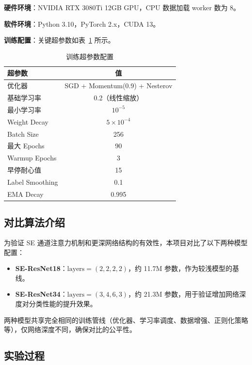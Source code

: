 \documentclass[12pt,a4paper]{ctexart}
\begin{document}
\textbf{硬件环境}：NVIDIA RTX 3080Ti 12GB GPU，CPU 数据加载 worker 数为 8。

\textbf{软件环境}：Python 3.10，PyTorch 2.x，CUDA 13。

\textbf{训练配置}：关键超参数如表~\ref{tab:hyperparams} 所示。

\begin{table}[H]
    \centering
    \caption{训练超参数配置}
    \label{tab:hyperparams}
    \begin{tabular}{lc}
        \toprule
        \textbf{超参数} & \textbf{值} \\
        \midrule
        优化器 & SGD + Momentum(0.9) + Nesterov \\
        基础学习率 & 0.2（线性缩放） \\
        最小学习率 & $10^{-5}$ \\
        Weight Decay & $5\times10^{-4}$ \\
        Batch Size & 256 \\
        最大 Epochs & 90 \\
        Warmup Epochs & 3 \\
        早停耐心值 & 15 \\
        Label Smoothing & 0.1 \\
        EMA Decay & 0.995 \\
        \bottomrule
    \end{tabular}
\end{table}

\subsection{对比算法介绍}

为验证 SE 通道注意力机制和更深网络结构的有效性，本项目对比了以下两种模型配置：

\begin{itemize}
    \item \textbf{SE-ResNet18}：$\text{layers}=(2,2,2,2)$，约 11.7M 参数，作为较浅模型的基线。
    \item \textbf{SE-ResNet34}：$\text{layers}=(3,4,6,3)$，约 21.3M 参数，用于验证增加网络深度对分类性能的提升效果。
\end{itemize}

两种模型共享完全相同的训练管线（优化器、学习率调度、数据增强、正则化策略等），仅网络深度不同，确保对比的公平性。

\subsection{实验过程}
\end{document}
